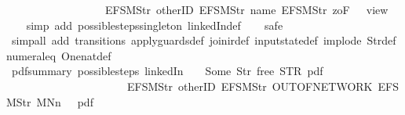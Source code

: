 \begin{isabellebody}
\ \ \ \ \ \ \ \ \ \ \ \ \ \ \ \ \ \ {\isacharbrackleft}EFSM{\isachardot}Str\ {\isacharprime}{\isacharprime}otherID{\isacharprime}{\isacharprime}{\isacharcomma}\ EFSM{\isachardot}Str\ {\isacharprime}{\isacharprime}name{\isacharprime}{\isacharprime}{\isacharcomma}\ EFSM{\isachardot}Str\ {\isacharprime}{\isacharprime}{}zoF{\isacharprime}{\isacharprime}{\isacharbrackright}\ {\isacharequal}\ {\isacharbraceleft}{\isacharbar}{\isacharparenleft}{}{\isacharcomma}\ view{}{\isacharparenright}{\isacharbar}{\isacharbraceright}{\isachardoublequoteclose}\isanewline
%
\isadelimproof
\ \ %
\endisadelimproof
%
\isatagproof
{}\isamarkupfalse%
\ {\isacharparenleft}simp\ add{\isacharcolon}\ possible{\isacharunderscore}steps{\isacharunderscore}singleton\ linkedIn{\isacharunderscore}def{\isacharparenright}\isanewline
\ \ \isamarkupfalse%
\ safe\isanewline
\ \ \isamarkupfalse%
\ {\isacharparenleft}simp{\isacharunderscore}all\ add{\isacharcolon}\ transitions\ apply{\isacharunderscore}guards{\isacharunderscore}def\ join{\isacharunderscore}ir{\isacharunderscore}def\ input{}state{\isacharunderscore}def\ implode\ Str{\isacharunderscore}def\ numeral{\isacharunderscore}{}{\isacharunderscore}eq{\isacharunderscore}{}\ One{\isacharunderscore}nat{\isacharunderscore}def{\isacharparenright}%
\endisatagproof
{\isafoldproof}%
%
\isadelimproof
\isanewline
%
\endisadelimproof
\isanewline
{}\isamarkupfalse%
\ pdf{\isacharunderscore}summary{\isacharcolon}\ {\isachardoublequoteopen}possible{\isacharunderscore}steps\ linkedIn\ {}\ {\isacharparenleft}{\isacharless}{\isachargreater}{\isacharparenleft}{}\ {\isachardollar}{\isacharcolon}{\isacharequal}\ Some\ {\isacharparenleft}Str\ {\isacharprime}{\isacharprime}free{\isacharprime}{\isacharprime}{\isacharparenright}{\isacharparenright}{\isacharparenright}\ STR\ {\isacharprime}{\isacharprime}pdf{\isacharprime}{\isacharprime}\isanewline
\ \ \ \ \ \ \ \ \ \ \ \ \ \ \ \ \ \ \ \ \ \ {\isacharbrackleft}EFSM{\isachardot}Str\ {\isacharprime}{\isacharprime}otherID{\isacharprime}{\isacharprime}{\isacharcomma}\ EFSM{\isachardot}Str\ {\isacharprime}{\isacharprime}OUT{\isacharunderscore}OF{\isacharunderscore}NETWORK{\isacharprime}{\isacharprime}{\isacharcomma}\ EFSM{\isachardot}Str\ {\isacharprime}{\isacharprime}MNn{}{\isacharprime}{\isacharprime}{\isacharbrackright}\ {\isacharequal}\ {\isacharbraceleft}{\isacharbar}{\isacharparenleft}{}{\isacharcomma}\ pdf{}{\isacharparenright}{\isacharbar}{\isacharbraceright}{\isachardoublequoteclose}\isanewline

\end{isabellebody}
